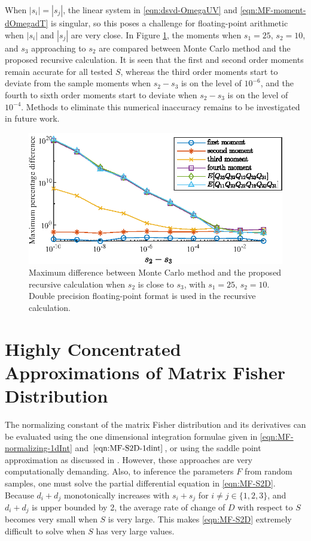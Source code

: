 When $|s_i|=|s_j|$, the linear system in \eqref{eqn:dsvd-OmegaUV} and \eqref{eqn:MF-moment-dOmegadT} is singular, so this poses a challenge for floating-point arithmetic when $|s_i|$ and $|s_j|$ are very close.
In Figure \ref{fig:MF-moment-error-degenerate}, the moments when $s_1=25$, $s_2=10$, and $s_3$ approaching to $s_2$ are compared between Monte Carlo method and the proposed recursive calculation.
It is seen that the first and second order moments remain accurate for all tested $S$, whereas the third order moments start to deviate from the sample moments when $s_2-s_3$ is on the level of $10^{-6}$, and the fourth to sixth order moments start to deviate when $s_2-s_3$ is on the level of $10^{-4}$.
Methods to eliminate this numerical inaccuracy remains to be investigated in future work.

\begin{figure}
	\centering
	\includegraphics[scale=1.4]{figures/MF-moment-error-degenerate}
	\caption{Maximum difference between Monte Carlo method and the proposed recursive calculation when $s_2$ is close to $s_3$, with $s_1=25$, $s_2=10$.
	Double precision floating-point format is used in the recursive calculation. \label{fig:MF-moment-error-degenerate}}
\end{figure}

\section{Highly Concentrated Approximations of Matrix Fisher Distribution} \label{section:MF-approx}

The normalizing constant of the matrix Fisher distribution and its derivatives can be evaluated using the one dimensional integration formulae given in \eqref{eqn:MF-normalizing-1dInt} and $\eqref{eqn:MF-S2D-1dint}$, or using the saddle point approximation as discussed in \cite{gilitschenski2014efficient}.
However, these approaches are very computationally demanding.
Also, to inference the parameters $F$ from random samples, one must solve the partial differential equation in \eqref{eqn:MF-S2D}.
Because $d_i+d_j$ monotonically increases with $s_i+s_j$ for $i\neq j \in \{1,2,3\}$, and $d_i+d_j$ is upper bounded by 2, the average rate of change of $D$ with respect to $S$ becomes very small when $S$ is very large.
This makes \eqref{eqn:MF-S2D} extremely difficult to solve when $S$ has very large values.


